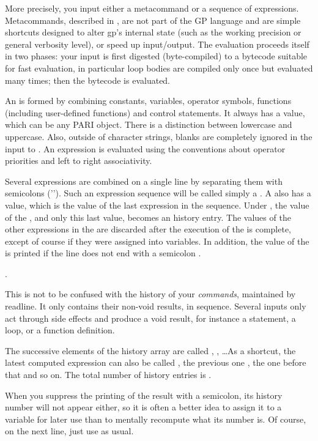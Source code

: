 More precisely, you input either a metacommand or a sequence of
expressions. Metacommands, described in , are not part of the
GP language and are simple shortcuts designed to alter gp's internal state
(such as the working precision or general verbosity level), or speed up
input/output. The evaluation proceeds itself in two phases: your input is
first digested (byte-compiled) to a bytecode suitable for fast evaluation,
in particular loop bodies are compiled only once but evaluated many times;
then the bytecode is evaluated.

An  is formed by combining
constants, variables, operator symbols, functions (including user-defined
functions) and control statements. It always has a value, which can be any
PARI object. There is a distinction between lowercase and uppercase. Also,
outside of character strings, blanks are completely ignored in the input to
. An expression is evaluated using the conventions about operator
priorities and left to right associativity.

Several expressions are combined on a single line by separating them with
semicolons ('\kbd{;}'). Such an expression sequence will be called simply a
. A  also has a value, which is the value of the last
expression in the sequence. Under , the value of the , and
only this last value, becomes an history entry. The values of the other
expressions in the  are discarded after the execution of the
 is complete, except of course if they were assigned into variables.
In addition, the value of the  is printed if the line does not end
with a semicolon \kbd{;}.

.

This is not to be confused with the history of your \emph{commands},
maintained by readline. It only contains their non-void results, in sequence.
Several inputs only act through side effects and produce a void result, for
instance a  statement, a  loop, or a function definition.

The successive elements of the history array are called , ,
\dots As a shortcut, the latest computed expression can also be
called \kbd{\%}, the previous one ,
the one before that  and so on. The total number of history entries
is \kbd{\%\#}.

When you suppress the printing of the result with a semicolon, its history
number will not appear either, so it is often a better idea to assign it to a
variable for later use than to mentally recompute what its number is. Of
course, on the next line, just use \kbd{\%} as usual.

